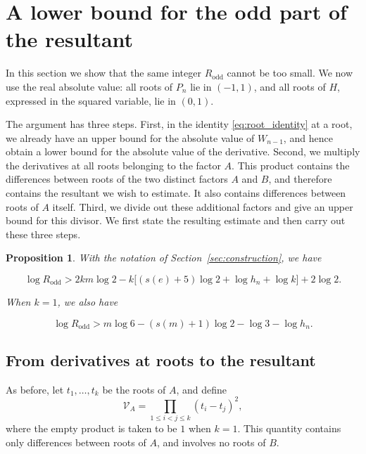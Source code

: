 \documentclass[11pt,a4paper]{article}
\numberwithin{equation}{section}
\newtheorem{proposition}[theorem]{Proposition}
\theoremstyle{definition}
\begin{document}
\section{A lower bound for the odd part of the resultant}\label{sec:lower}

In this section we show that the same integer \(R_{\mathrm{odd}}\) cannot be too small. We now use the real absolute value: all roots of \(P_n\) lie in \((-1,1)\), and all roots of \(H\), expressed in the squared variable, lie in \((0,1)\).

The argument has three steps. First, in the identity \eqref{eq:root_identity} at a root, we already have an upper bound for the absolute value of \(W_{n-1}\), and hence obtain a lower bound for the absolute value of the derivative. Second, we multiply the derivatives at all roots belonging to the factor \(A\). This product contains the differences between roots of the two distinct factors \(A\) and \(B\), and therefore contains the resultant we wish to estimate. It also contains differences between roots of \(A\) itself. Third, we divide out these additional factors and give an upper bound for this divisor. We first state the resulting estimate and then carry out these three steps.

\begin{proposition}\label{prop:lower}
With the notation of Section~\ref{sec:construction}, we have

\begin{equation}
\log R_{\mathrm{odd}}
>2km\log2-k\big[(s(e)+5)\log2+\log h_n+\log k\big]
+2\log2.
\label{eq:old6.5}
\end{equation}

When \(k=1\), we also have

\begin{equation}
\log R_{\mathrm{odd}}
>m\log6-(s(m)+1)\log2-\log3-\log h_n.
\label{eq:old6.6}
\end{equation}
\end{proposition}

\subsection{From derivatives at roots to the resultant}

As before, let \(t_1,\ldots,t_k\) be the roots of \(A\), and define
\[
\mathcal V_A=\prod_{1\le i<j\le k}(t_i-t_j)^2,
\]
where the empty product is taken to be \(1\) when \(k=1\). This quantity contains only differences between roots of \(A\), and involves no roots of \(B\).
\end{document}
